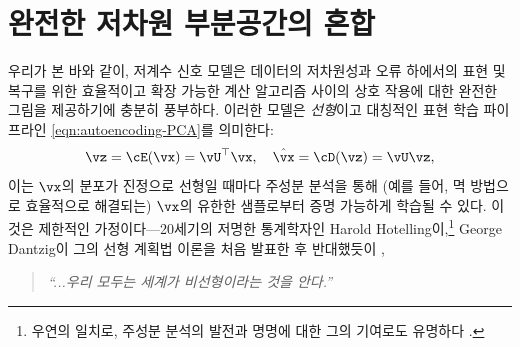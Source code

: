 \documentclass[../../book-main_ko.tex]{subfiles}
\begin{document}
\section{완전한 저차원 부분공간의 혼합}%
\label{sec:ica}
우리가 본 바와 같이, 저계수 신호 모델은 데이터의 저차원성과 오류 하에서의 표현 및 복구를 위한 효율적이고 확장 가능한 계산 알고리즘 사이의 상호 작용에 대한 완전한 그림을 제공하기에 충분히 풍부하다.
이러한 모델은 \textit{선형}이고 대칭적인 표현 학습 파이프라인 \eqref{eqn:autoencoding-PCA}를 의미한다:
\begin{equation*}
    \vz = \cE(\vx) = \vU^\top \vx, \quad \hat{\vx} = \cD(\vz) = \vU \vz,
\end{equation*}
이는 \(\vx\)의 분포가 진정으로 선형일 때마다 주성분 분석을 통해 (예를 들어, 멱 방법으로 효율적으로 해결되는) \(\vx\)의 유한한 샘플로부터 증명 가능하게 학습될 수 있다.
이것은 제한적인 가정이다---20세기의 저명한 통계학자인 Harold Hotelling이,\footnote{우연의 일치로, 주성분 분석의 발전과 명명에 대한 그의 기여로도 유명하다 \cite{Hotelling1933}.} George Dantzig이 그의 선형 계획법 이론을 처음 발표한 후 반대했듯이 \cite{Dantzig2002-eh},
\begin{quote}
\centering
    \textit{``...우리 모두는 세계가 비선형이라는 것을 안다.''}
\end{quote}
\end{document}
